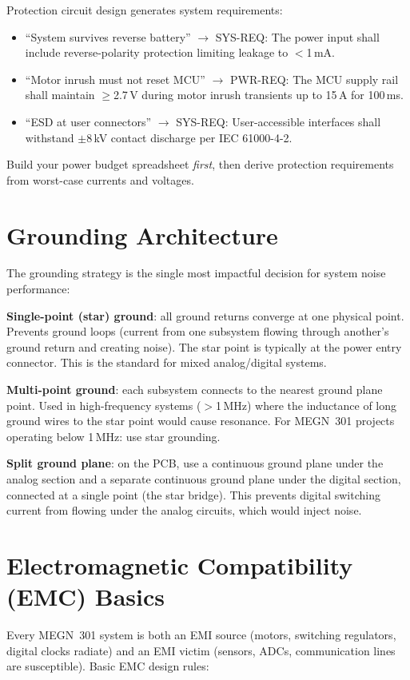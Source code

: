\documentclass[11pt,letterpaper,twoside,openany]{book}
\begin{document}
\begin{keyconceptbox}
Protection circuit design generates system requirements:
\begin{itemize}[nosep,leftmargin=1.5em]
\item ``System survives reverse battery'' $\to$ SYS-REQ: The power input shall include reverse-polarity protection limiting leakage to $<$1\,mA.
\item ``Motor inrush must not reset MCU'' $\to$ PWR-REQ: The MCU supply rail shall maintain $\geq$2.7\,V during motor inrush transients up to 15\,A for 100\,ms.
\item ``ESD at user connectors'' $\to$ SYS-REQ: User-accessible interfaces shall withstand $\pm$8\,kV contact discharge per IEC 61000-4-2.
\end{itemize}
Build your power budget spreadsheet \emph{first}, then derive protection requirements from worst-case currents and voltages.
\end{keyconceptbox}


\section{Grounding Architecture}
The grounding strategy is the single most impactful decision for system noise performance:

\textbf{Single-point (star) ground}: all ground returns converge at one physical point. Prevents ground loops (current from one subsystem flowing through another's ground return and creating noise). The star point is typically at the power entry connector. This is the standard for mixed analog/digital systems.

\textbf{Multi-point ground}: each subsystem connects to the nearest ground plane point. Used in high-frequency systems ($>$1\,MHz) where the inductance of long ground wires to the star point would cause resonance. For MEGN~301 projects operating below 1\,MHz: use star grounding.

\textbf{Split ground plane}: on the PCB, use a continuous ground plane under the analog section and a separate continuous ground plane under the digital section, connected at a single point (the star bridge). This prevents digital switching current from flowing under the analog circuits, which would inject noise.

\section{Electromagnetic Compatibility (EMC) Basics}
Every MEGN~301 system is both an EMI source (motors, switching regulators, digital clocks radiate) and an EMI victim (sensors, ADCs, communication lines are susceptible). Basic EMC design rules:
\end{document}

